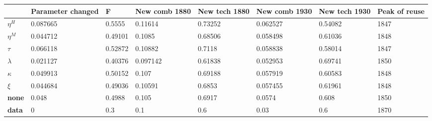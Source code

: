 \begin{tabular}{|l|l|l|l|l|l|l|l|}
\hline
&\textbf{Parameter changed}&\textbf{F}&\textbf{New comb 1880}&\textbf{New tech 1880}&\textbf{New comb 1930}&\textbf{New tech 1930}&\textbf{Peak of reuse}\\\hline
\textbf{$\eta^H$}&0.087665&0.5555&0.11614&0.73252&0.062527&0.54082&1847\\\hline
\textbf{$\eta^M$}&0.044712&0.49101&0.1085&0.68506&0.058498&0.61036&1848\\\hline
\textbf{$\tau$}&0.066118&0.52872&0.10882&0.7118&0.058838&0.58014&1847\\\hline
\textbf{$\lambda$}&0.021127&0.40376&0.097142&0.61838&0.052953&0.69741&1850\\\hline
\textbf{$\kappa$}&0.049913&0.50152&0.107&0.69188&0.057919&0.60583&1848\\\hline
\textbf{$\xi$}&0.044684&0.49036&0.10591&0.6853&0.057455&0.61961&1848\\\hline
\textbf{none}&0.048&0.4988&0.105&0.6917&0.0574&0.608&1850\\\hline
\textbf{data}&0&0.3&0.1&0.6&0.03&0.6&1870\\\hline
\end{tabular}
